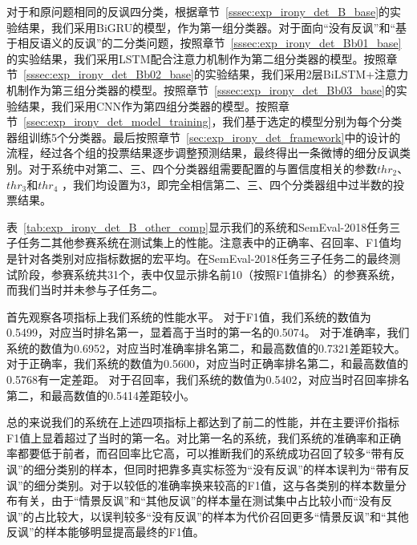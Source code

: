 对于和原问题相同的反讽四分类，根据章节~\ref{sssec:exp_irony_det_B_base}的实验结果，我们采用BiGRU的模型，作为第一组分类器。对于面向“没有反讽”和“基于相反语义的反讽”的二分类问题，按照章节~\ref{sssec:exp_irony_det_Bb01_base}的实验结果，我们采用LSTM配合注意力机制作为第二组分类器的模型。按照章节~\ref{sssec:exp_irony_det_Bb02_base}的实验结果，我们采用2层BiLSTM+注意力机制作为第三组分类器的模型。按照章节~\ref{sssec:exp_irony_det_Bb03_base}的实验结果，我们采用CNN作为第四组分类器的模型。按照章节~\ref{ssec:exp_irony_det_model_training}，我们基于选定的模型分别为每个分类器组训练5个分类器。最后按照章节~\ref{sec:exp_irony_det_framework}中的设计的流程，经过各个组的投票结果逐步调整预测结果，最终得出一条微博的细分反讽类别。对于系统中对第二、三、四个分类器组需要配置的与置信度相关的参数$thr_2$、$thr_3$和$thr_4$ ，我们均设置为3，即完全相信第二、三、四个分类器组中过半数的投票结果。

表~\ref{tab:exp_irony_det_B_other_comp}显示我们的系统和SemEval-2018任务三子任务二其他参赛系统在测试集上的性能。注意表中的正确率、召回率、F1值均是针对各类别对应指标数据的宏平均。在SemEval-2018任务三子任务二的最终测试阶段，参赛系统共31个，表中仅显示排名前10（按照F1值排名）的参赛系统，而我们当时并未参与子任务二。
 
首先观察各项指标上我们系统的性能水平。
对于F1值，我们系统的数值为0.5499，对应当时排名第一，显着高于当时的第一名的0.5074。
对于准确率，我们系统的数值为0.6952，对应当时准确率排名第二，和最高数值的0.7321差距较大。
对于正确率，我们系统的数值为0.5600，对应当时正确率排名第二，和最高数值的0.5768有一定差距。
对于召回率，我们系统的数值为0.5402，对应当时召回率排名第二，和最高数值的0.5414差距较小。

总的来说我们的系统在上述四项指标上都达到了前二的性能，并在主要评价指标F1值上显着超过了当时的第一名。对比第一名的系统，我们系统的准确率和正确率都要低于前者，而召回率比它高，可以推断我们的系统成功召回了较多“带有反讽”的细分类别的样本，但同时把靠多真实标签为“没有反讽”的样本误判为“带有反讽”的细分类别。对于以较低的准确率换来较高的F1值，这与各类别的样本数量分布有关，由于“情景反讽”和“其他反讽”的样本量在测试集中占比较小而“没有反讽”的占比较大，以误判较多“没有反讽”的样本为代价召回更多“情景反讽”和“其他反讽”的样本能够明显提高最终的F1值。

